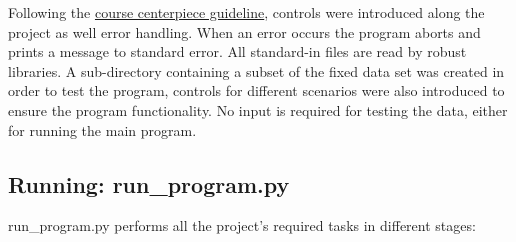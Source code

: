 \documentclass[12pt]{article}
\begin{document}
Following the \href{https://journals.plos.org/ploscompbiol/article?id=10.1371/journal.pcbi.1000424#s6}{course centerpiece guideline}, controls were introduced along the project as well error handling. When an error occurs the program aborts and prints a message to standard error. All standard-in files are read by robust libraries. 
A sub-directory containing a subset of the fixed data set was created in order to test the program, controls for different scenarios were also introduced to ensure the program functionality. No input is required for testing the data, either for running the main program.\\

\subsection{Running: run\_program.py}

run\_program.py performs all the project's required tasks in different stages:
\end{document}
